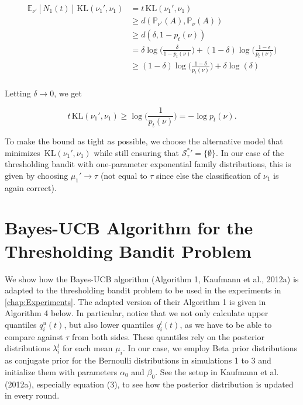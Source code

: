 \documentclass[11pt,]{article}
\newcommand{\KL}{\,\text{KL}}
\begin{document}
\begin{align*}
\mathbb{E}_{\nu'}[N_1(t)]\KL(\nu_1', \nu_1) & = t \KL(\nu_1', \nu_1) \\
& \geq d(\mathbb{P}_{\nu'}(A), \mathbb{P}_{\nu}(A)) \\
& \geq d(\delta, 1- p_t(\nu)) \\
& = \delta \log\Big(\frac{\delta}{1-p_t(\nu)}\Big) + (1-\delta) \log \Big(\frac{1-\epsilon}{p_t(\nu)}\Big) \\
& \geq (1-\delta) \log \Big(\frac{1-\delta}{p_t(\nu)}\Big) + \delta \log(\delta) \\
\end{align*}

Letting \(\delta \rightarrow 0\), we get

\[
t \KL(\nu_1', \nu_1) \geq \log \Big(\frac{1}{p_t(\nu)}\Big) = -\log p_t(\nu).
\]

To make the bound as tight as possible, we choose the alternative model
that minimizes \(\KL(\nu_1', \nu_1)\) while still ensuring that
\(\mathcal{S}_{\tau}^* {'} = \{\emptyset\}\). In our case of the
thresholding bandit with one-parameter exponential family distributions,
this is given by choosing \(\mu_1' \rightarrow \tau\) (not equal to
\(\tau\) since else the classification of \(\nu_1\) is again correct).

\section{Bayes-UCB Algorithm for the Thresholding Bandit Problem} \label{app:AppendixBUCB}

We show how the Bayes-UCB algorithm (Algorithm 1, Kaufmann et al.,
2012a) is adapted to the thresholding bandit problem to be used in the
experiments in \autoref{chap:Experiments}. The adapted version of their
Algorithm 1 is given in Algorithm 4 below. In particular, notice that we
not only calculate upper quantiles \(q_i^u(t)\), but also lower
quantiles \(q_i^l(t)\), as we have to be able to compare against
\(\tau\) from both sides. These quantiles rely on the posterior
distributions \(\lambda_i^t\) for each mean \(\mu_i\). In our case, we
employ Beta prior distributions as conjugate prior for the Bernoulli
distributions in simulations 1 to 3 and initialize them with parameters
\(\alpha_0\) and \(\beta_0\). See the setup in Kaufmann et al. (2012a),
especially equation (3), to see how the posterior distribution is
updated in every round.

\IncMargin{1em}
\end{document}

